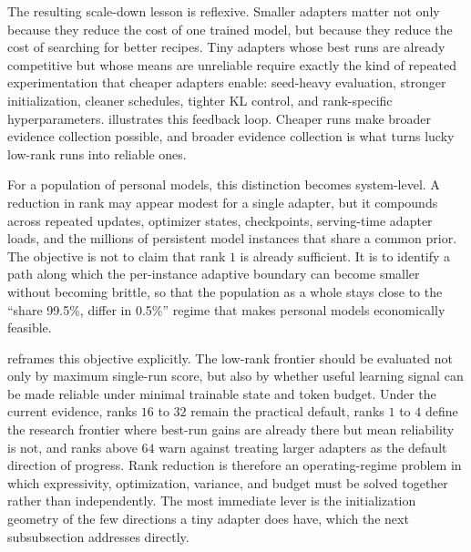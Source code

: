 \documentclass{llmxive}
\begin{document}
The resulting scale-down lesson is reflexive. Smaller adapters matter not only because they reduce the cost of one trained model, but because they reduce the cost of searching for better recipes. Tiny adapters whose best runs are already competitive but whose means are unreliable require exactly the kind of repeated experimentation that cheaper adapters enable: seed-heavy evaluation, stronger initialization, cleaner schedules, tighter KL control, and rank-specific hyperparameters.  illustrates this feedback loop. Cheaper runs make broader evidence collection possible, and broader evidence collection is what turns lucky low-rank runs into reliable ones.



For a population of personal models, this distinction becomes system-level. A reduction in rank may appear modest for a single adapter, but it compounds across repeated updates, optimizer states, checkpoints, serving-time adapter loads, and the millions of persistent model instances that share a common prior. The objective is not to claim that rank $1$ is already sufficient. It is to identify a path along which the per-instance adaptive boundary can become smaller without becoming brittle, so that the population as a whole stays close to the ``share 99.5\%, differ in 0.5\%'' regime that makes personal models economically feasible.



 reframes this objective explicitly. The low-rank frontier should be evaluated not only by maximum single-run score, but also by whether useful learning signal can be made reliable under minimal trainable state and token budget. Under the current evidence, ranks $16$ to $32$ remain the practical default, ranks $1$ to $4$ define the research frontier where best-run gains are already there but mean reliability is not, and ranks above $64$ warn against treating larger adapters as the default direction of progress. Rank reduction is therefore an operating-regime problem in which expressivity, optimization, variance, and budget must be solved together rather than independently. The most immediate lever is the initialization geometry of the few directions a tiny adapter does have, which the next subsubsection addresses directly.
\end{document}
